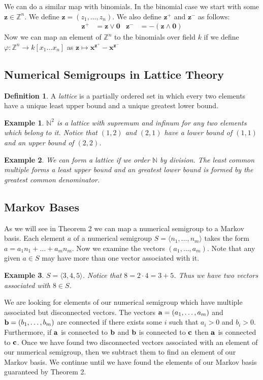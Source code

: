 \documentclass[11pt]{amsart}
\theoremstyle{plain}
\newtheorem{exa}{Example}
\theoremstyle{definition}
\newtheorem{defi}{Definition}
\begin{document}
We can do a similar map with binomials.
In the binomial case we start with some $\mathbf{z}\in \mathbb{Z}^n$.
We define $\mathbf{z}=(z_1,\dots,z_n)$.
We also define $\mathbf{z}^+$ and $\mathbf{z}^-$ as follows:
\begin{align*}
  \mathbf{z}^+&=\mathbf{z}\vee\mathbf{0}&
  \mathbf{z}^-&=-(\mathbf{z}\wedge\mathbf{0})
\end{align*}
Now we can map an element of $\mathbb{Z}^n$ to the binomials over field $k$ if
we define $\varphi:\mathbb{Z}^n\to k[x_1\dots x_n]$ as $\mathbf{z}\mapsto
\mathbf{x}^{\mathbf{z}^+}-\mathbf{x}^{\mathbf{z}^-}$

\subsection{Numerical Semigroups in Lattice Theory}
\begin{defi}
\cite{stanley}
A \emph{lattice} is a partially ordered set in which every two elements have a
unique least upper bound and a unique greatest lower bound.
\end{defi}
\begin{exa}
$\mathbb{N}^2$ is a lattice with supremum and infinum for any two elements which
belong to it. Notice that $(1,2)$ and $(2,1)$ have a lower bound of $(1,1)$ and
an upper bound of $(2,2)$.
\end{exa}
\begin{exa}
We can form a lattice if we order $\mathbb{N}$ by division. The least common
multiple forms a least upper bound and an greatest lower bound is formed by the
greatest common denominator.
\end{exa}
\subsection{Markov Bases}
As we will see in Theorem 2 we can map a numerical semigroup to a Markov
basis\cite{bernd}.
Each element $a$ of a numerical semigroup $S=\langle n_1,\dots,n_m\rangle$ takes
the form $a=a_1n_1+\dots+a_mn_m$. Now we examine the vectors $(a_1,\dots,a_m)$.
Note that any given $a\in S$ may have more than one vector associated with it.
\begin{exa}
  $S=\langle 3,4,5\rangle$. Notice that $8=2\cdot 4=3+5$. Thus we have two
  vectors associated with $8\in S$.
\end{exa}
We are looking for elements of our numerical semigroup which have multiple
associated but disconnected vectors. The vectors ${\bf a}=(a_1,\dots,a_m)$
and ${\bf b}=(b_1,\dots,b_m)$ are connected if there exists some $i$
such that $a_i>0$ and $b_i>0$. Furthermore, if ${\bf a}$ is connected to
${\bf b}$ and ${\bf b}$ is connected to ${\bf c}$ then ${\bf a}$ is connected to
${\bf c}$. Once we have found two disconnected vectors associated with an
element of our numerical semigroup, then we subtract them to find an element
of our Markov basis. We continue until we have found the elements of our Markov
basis guaranteed by Theorem 2.
\end{document}

